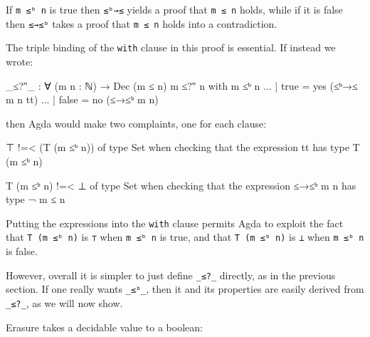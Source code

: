 If \texttt{m\ ≤ᵇ\ n} is true then \texttt{≤ᵇ→≤} yields a proof that
\texttt{m\ ≤\ n} holds, while if it is false then \texttt{≤→≤ᵇ} takes a
proof that \texttt{m\ ≤\ n} holds into a contradiction.

The triple binding of the \texttt{with} clause in this proof is
essential. If instead we wrote:

\begin{myDisplay}
_≤?″_ : ∀ (m n : ℕ) → Dec (m ≤ n)
m ≤?″ n with m ≤ᵇ n
... | true   =  yes (≤ᵇ→≤ m n tt)
... | false  =  no (≤→≤ᵇ {m} {n})
\end{myDisplay}

then Agda would make two complaints, one for each clause:

\begin{myDisplay}
⊤ !=< (T (m ≤ᵇ n)) of type Set
when checking that the expression tt has type T (m ≤ᵇ n)

T (m ≤ᵇ n) !=< ⊥ of type Set
when checking that the expression ≤→≤ᵇ {m} {n} has type ¬ m ≤ n
\end{myDisplay}

Putting the expressions into the \texttt{with} clause permits Agda to
exploit the fact that \texttt{T\ (m\ ≤ᵇ\ n)} is \texttt{⊤} when
\texttt{m\ ≤ᵇ\ n} is true, and that \texttt{T\ (m\ ≤ᵇ\ n)} is \texttt{⊥}
when \texttt{m\ ≤ᵇ\ n} is false.

However, overall it is simpler to just define \texttt{\_≤?\_} directly,
as in the previous section. If one really wants \texttt{\_≤ᵇ\_}, then it
and its properties are easily derived from \texttt{\_≤?\_}, as we will
now show.

Erasure takes a decidable value to a boolean:

\begin{fence}
\begin{code}%
\>[0]\AgdaSpace{}%
\AgdaSymbol{:}\AgdaSpace{}%
\AgdaSpace{}%
\AgdaSymbol{\{}\AgdaSpace{}%
\AgdaSymbol{:}\AgdaSpace{}%
\AgdaSymbol{\}}\AgdaSpace{}%
\AgdaSpace{}%
\AgdaSpace{}%
\AgdaSpace{}%
\AgdaSpace{}%
\<%
\\
\>[0]\AgdaSpace{}%
\AgdaSpace{}%
\AgdaSpace{}%
%
\>[11]\AgdaSymbol{=}%
\>[14]\<%
\\
\>[0]\AgdaSpace{}%
\AgdaSpace{}%
\AgdaSpace{}%
%
\>[11]\AgdaSymbol{=}%
\>[14]\<%
\end{code}
\end{fence}

